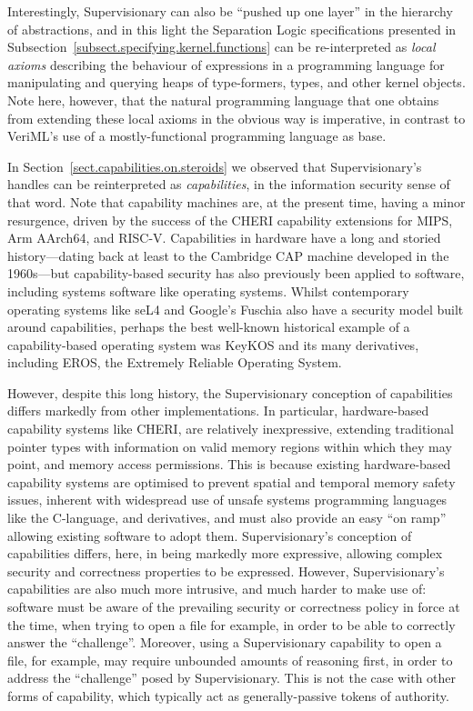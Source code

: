 \documentclass[a4paper, UKenglish, cleveref, autoref, thm-restate, colorlinks]{lipics-v2021}
\begin{document}
Interestingly, Supervisionary can also be ``pushed up one layer'' in the hierarchy of abstractions, and in this light the Separation Logic specifications presented in Subsection~\ref{subsect.specifying.kernel.functions} can be re-interpreted as \emph{local axioms} describing the behaviour of expressions in a programming language for manipulating and querying heaps of type-formers, types, and other kernel objects.
Note here, however, that the natural programming language that one obtains from extending these local axioms in the obvious way is imperative, in contrast to VeriML's use of a mostly-functional programming language as base.

In Section~\ref{sect.capabilities.on.steroids} we observed that Supervisionary's handles can be reinterpreted as \emph{capabilities}, in the information security sense of that word.
Note that capability machines are, at the present time, having a minor resurgence, driven by the success of the CHERI capability extensions for MIPS, Arm AArch64, and RISC-V.
Capabilities in hardware have a long and storied history---dating back at least to the Cambridge CAP machine developed in the 1960s---but capability-based security has also previously been applied to software, including systems software like operating systems.
Whilst contemporary operating systems like seL4 and Google's Fuschia also have a security model built around capabilities, perhaps the best well-known historical example of a capability-based operating system was KeyKOS and its many derivatives, including EROS, the Extremely Reliable Operating System.

However, despite this long history, the Supervisionary conception of capabilities differs markedly from other implementations.
In particular, hardware-based capability systems like CHERI, are relatively inexpressive, extending traditional pointer types with information on valid memory regions within which they may point, and memory access permissions.
This is because existing hardware-based capability systems are optimised to prevent spatial and temporal memory safety issues, inherent with widespread use of unsafe systems programming languages like the C-language, and derivatives, and must also provide an easy ``on ramp'' allowing existing software to adopt them.
Supervisionary's conception of capabilities differs, here, in being markedly more expressive, allowing complex security and correctness properties to be expressed.
However, Supervisionary's capabilities are also much more intrusive, and much harder to make use of: software must be aware of the prevailing security or correctness policy in force at the time, when trying to open a file for example, in order to be able to correctly answer the ``challenge''.
Moreover, using a Supervisionary capability to open a file, for example, may require unbounded amounts of reasoning first, in order to address the ``challenge'' posed by Supervisionary.
This is not the case with other forms of capability, which typically act as generally-passive tokens of authority.
\end{document}
